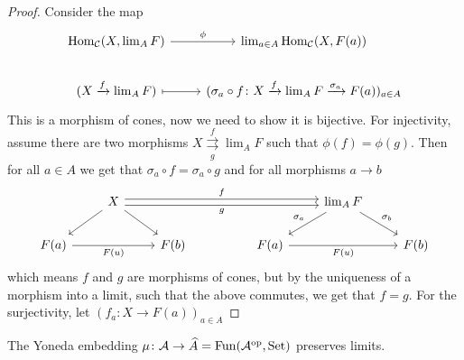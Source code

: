 \begin{proof}
    Consider the map
    \[
    \begin{tikzcd}
        \Hom_{\mathcal{C}}(X, \lim_A F) 
        \arrow[r, "\phi"]
        &
        \lim_{a \in A} \Hom_{\mathcal{C}} ( X, F(a)) 
        \\
        (X \xrightarrow{f} \lim_A F) 
        \arrow[r, mapsto]
        &
        (\sigma_a  \circ f\colon X \xrightarrow{f} \lim_A F \xrightarrow{\sigma_a} F(a))_{a \in A}
    \end{tikzcd}
    \]
    This is a morphism of cones, now we need to show it is bijective.
    For injectivity, assume there are two morphisms $ X \underset{g}{\overset{f}{{\rightrightarrows}}} \lim_A F$ such that $\phi(f)=\phi(g)$.
    Then for all $a \in A$ we get that $\sigma_a \circ f = \sigma_a \circ g$ and for all morphisms $a \to b$
    \[
    \begin{tikzcd}
        &
        X
        \arrow[rrrr, shift left , "f"]
        \arrow[rrrr, shift right, "g"']
        \arrow[ld]
        \arrow[rd]
        &
        &
        &
        &
        \lim_A F
        \arrow[ld, "\sigma_a"']
        \arrow[rd, "\sigma_b"]
        &
        \\
        F(a)
        \arrow[rr, "F(u)"']
        &
        &
        F(b)
        &
        &
        F(a)
        \arrow[rr ,"F(u)"']
        &
        &
        F(b)
    \end{tikzcd}
    \]
    which means $f$ and $g$ are morphisms of cones, but by the uniqueness of a morphism into a limit, such that the above commutes, we get that $f=g$.
    For the surjectivity, let $(f_a \colon X \to F(a))_{a\in A}$

\end{proof}

\begin{thm}
    The Yoneda embedding $\mu \colon \mathcal{A} \to \widehat{A} = \operatorname{Fun} ( \mathcal{A}^{\operatorname{op}}, \operatorname{Set} )$ preserves limits.
\end{thm}